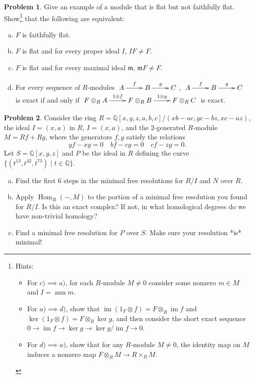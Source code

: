 \documentclass[11pt]{article}
\DeclareMathOperator{\Hom}{Hom}
\DeclareMathOperator{\im}{im}
\newcommand{\m}{\mathfrak{m}}
\DeclareMathOperator{\ann}{ann}
\theoremstyle{definition}
\newtheorem{problem}{Problem}
\begin{document}
\begin{problem} Give an example of a module that is flat but not faithfully flat. Show\footnote{Hints: \begin{itemize}
	\item For $c) \implies a)$, for each $R$-module $M \neq 0$ consider some nonzero $m \in M$ and $I = \ann m$. 
	\item For $a) \implies d)$, show that $\im(1_F \otimes f) = F \otimes_R \im f$ and $\ker(1_F \otimes f) = F \otimes_R \ker g$, and then consider the short exact sequence $0 \longrightarrow \im f \longrightarrow \ker g \longrightarrow \ker g/\im f \longrightarrow 0$. 
	\item For $d) \implies a)$, show that for any $R$-module $M \neq 0$, the identity map on $M$ induces a nonzero map $F \otimes_R M \longrightarrow R \times_R M$.
\end{itemize}}
 that the following are equivalent:	
\begin{enumerate}[a)]
		\item $F$ is faithfully flat.
		\item $F$ is flat and for every proper ideal $I$, $IF \neq F$.
		\item $F$ is flat and for every maximal ideal $\m$, $\m F \neq F$.
		\item For every sequence of $R$-modules $\xymatrix{A \ar[r]^-f & B \ar[r]^-g & C}$, $\xymatrix{A \ar[r]^-f & B \ar[r]^-g & C}$ is exact if and only if $\xymatrix{F \otimes_R A \ar[r]^-{1 \otimes f} & F \otimes_R B \ar[r]^-{1 \otimes g} & F \otimes_R C}$ is exact.
	\end{enumerate}
\end{problem}

\vspace{2em}

\begin{problem}
	Consider the ring $R = \mathbb{Q}[x,y,z,a,b,c]/(xb-ac,yc-bz,xc-az)$, the ideal $I = (x,a)$ in $R$, $I = (x,a)$, and the $2$-generated $R$-module $M = Rf + Rg$, where the generators $f, g$ satisfy the relations 
		$$yf-xg = 0 \quad bf - cg = 0 \quad cf - zg = 0.$$
		Let $S = \mathbb{Q}[x,y,z]$ and $P$ be the ideal in $R$ defining the curve $\lbrace (t^{13},t^{42},t^{73}) \mid t \in \mathbb{Q} \rbrace$.
		\begin{enumerate}[a)]
			\item Find the first $6$ steps in the minimal free resolutions for $R/I$ and $N$ over $R$.
			\item Apply $\Hom_R(-,M)$ to the portion of a minimal free resolution you found for $R/I$. Is this an exact complex? If not, in what homological degrees do we have non-trivial homology? 
			\item Find a minimal free resolution for $P$ over $S$. Make sure your resolution *is* minimal!
		\end{enumerate}
\end{problem}
\end{document}
